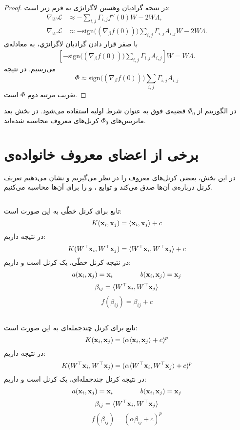 \begin{thm}
\begin{proof}
در نتیجه‌ گرادیان وهسین لاگرانژی به فرم زیر است:
\begin{align}
\nabla_{W} \mathcal{L} &\approx -\sum_{i,j} \Gamma_{i,j} f''(0) W - 2W\Lambda,\\
\nabla_{W} \mathcal{L} &\approx -\mathrm{sign}\Big( (\nabla_\beta f(0))\Big) \sum_{i,j} \Gamma_{i,j} A_{i,j} W - 2W\Lambda.
\end{align}
با صفر قرار دادن گرادیان لاگرانژي، به معادله‌ی 
\begin{align}
\left[ -\mathrm{sign}\big( (\nabla_\beta f(0))\big) \sum_{i,j} \Gamma_{i,j} A_{i,j} \right] W = W\Lambda.
\end{align}
می‌رسیم. در نتیجه 
\begin{equation}
\Phi \approx \mathrm{sign}\Big( (\nabla_\beta f(0))\Big) \sum_{i, j} \Gamma_{i, j} A_{i, j}
\end{equation}
تقریب مرتبه دوم 
$\Phi$
است.
\end{proof}
\end{thm}
 
در الگوریتم 
از
$\Phi_0$
قضیه‌ی فوق  به عنوان شرط اولیه استفاده می‌شود. در بخش بعد ماتریس‌های
$\Phi_0$
کرنل‌های معروف 
محاسبه شده‌اند.

\section{برخی از اعضای معروف خانواده‌ی 
}
در این بخش، بعضی کرنل‌های معروف را در نظر می‌گیریم و نشان می‌دهیم تعریف کرنل
درباره‌ی آن‌ها صدق می‌کند و توابع
،
و
را برای آن‌ها محاسبه می‌کنیم. 
\subsection{}
تابع
برای کرنل خطّی به این صورت است:
\[K(\mathbf{x}_i,\mathbf{x}_j) = \langle\mathbf{x}_i,\mathbf{x}_j\rangle + c\]
در نتیجه داریم:
\[K(W^\top\mathbf{x}_i,W^\top\mathbf{x}_j) = \langle W^\top\mathbf{x}_i,W^\top\mathbf{x}_j\rangle + c\]
در نتیجه کرنل خطّی، یک کرنل
است و داریم:
\[a(\mathbf{x}_i,\mathbf{x}_j) = \mathbf{x}_i\qquad\qquad b(\mathbf{x}_i,\mathbf{x}_j) = \mathbf{x}_j\]
\[\beta_{ij} = \langle W^\top\mathbf{x}_i,W^\top\mathbf{x}_j\rangle \]
\[f(\beta_{ij}) = \beta_{ij} + c\]
\subsection{}
تابع
برای کرنل چندجمله‌ای به این صورت است:
\[K(\mathbf{x}_i,\mathbf{x}_j) = (\alpha\langle\mathbf{x}_i,\mathbf{x}_j\rangle + c)^p\]
در نتیجه داریم:
\[K(W^\top\mathbf{x}_i,W^\top\mathbf{x}_j) = (\alpha\langle W^\top\mathbf{x}_i,W^\top\mathbf{x}_j\rangle + c)^p\]
در نتیجه کرنل چندجمله‌ای، یک کرنل
است و داریم:
\[a(\mathbf{x}_i,\mathbf{x}_j) = \mathbf{x}_i\qquad\qquad b(\mathbf{x}_i,\mathbf{x}_j) = \mathbf{x}_j\]
\[\beta_{ij} = \langle W^\top\mathbf{x}_i,W^\top\mathbf{x}_j\rangle \]
\[f(\beta_{ij}) = (\alpha\beta_{ij} + c)^p\]

